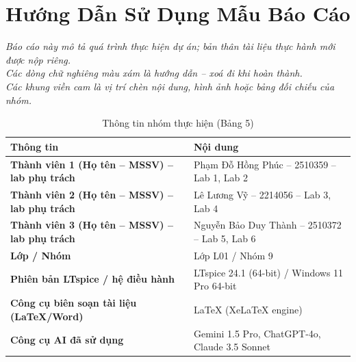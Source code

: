 \documentclass[12pt,a4paper]{report}
\begin{document}
\tableofcontents
\newpage


\chapter*{Hướng Dẫn Sử Dụng Mẫu Báo Cáo}

\begin{orangeboxshaded}
\textit{\color{guidegray}
Báo cáo này mô tả quá trình thực hiện dự án; bản thân tài liệu thực hành mới được nộp riêng.\\
Các dòng chữ nghiêng màu xám là hướng dẫn -- xoá đi khi hoàn thành.\\
Các khung viền cam là vị trí chèn nội dung, hình ảnh hoặc bảng đối chiếu của nhóm.
}
\end{orangeboxshaded}

\vspace{0.5cm}
\begin{table}[H]
\centering
\caption{Thông tin nhóm thực hiện (Bảng 5)}
\label{tab:bang5_thongtin}
\renewcommand{\arraystretch}{1.3}
\begin{tabularx}{\textwidth}{|l|X|}
\hline
\rowcolor{codebg}
\textbf{Thông tin} & \textbf{Nội dung} \\ \hline
\textbf{Thành viên 1 (Họ tên -- MSSV) -- lab phụ trách} & Phạm Đỗ Hồng Phúc -- 2510359 -- Lab 1, Lab 2 \\ \hline
\textbf{Thành viên 2 (Họ tên -- MSSV) -- lab phụ trách} & Lê Lương Vỹ -- 2214056 -- Lab 3, Lab 4 \\ \hline
\textbf{Thành viên 3 (Họ tên -- MSSV) -- lab phụ trách} & Nguyễn Bảo Duy Thành -- 2510372 -- Lab 5, Lab 6 \\ \hline
\textbf{Lớp / Nhóm} & Lớp L01 / Nhóm 9 \\ \hline
\textbf{Phiên bản LTspice / hệ điều hành} & LTspice 24.1 (64-bit) / Windows 11 Pro 64-bit \\ \hline
\textbf{Công cụ biên soạn tài liệu (LaTeX/Word)} & LaTeX (XeLaTeX engine) \\ \hline
\textbf{Công cụ AI đã sử dụng} & Gemini 1.5 Pro, ChatGPT-4o, Claude 3.5 Sonnet \\ \hline
\end{tabularx}
\end{table}
\end{document}
